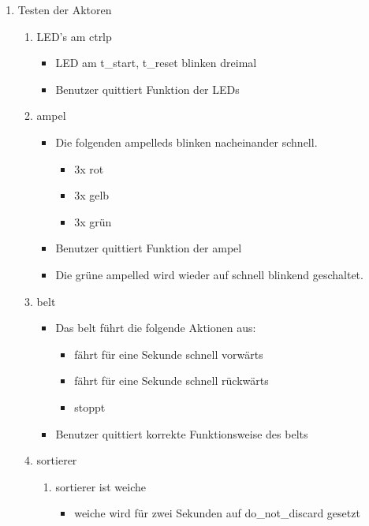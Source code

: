 \begin{enumerate}
    \item Testen der Aktoren
    \begin{enumerate}
        \item LED's am \gls{ctrlp}
        \begin{itemize}
            \item LED am \gls{t_start}, \gls{t_reset} blinken dreimal
            \item Benutzer quittiert Funktion der LEDs
        \end{itemize}
        \item \Gls{ampel}
        \begin{itemize}
            \item Die folgenden \glspl{ampelled} blinken nacheinander schnell.
            \begin{itemize}
                \item 3x rot
                \item 3x gelb
                \item 3x grün
            \end{itemize}
            \item Benutzer quittiert Funktion der \gls{ampel}
            \item Die grüne \Gls{ampelled} wird wieder auf schnell blinkend geschaltet.
        \end{itemize}
        \item \Gls{belt}
        \begin{itemize}
            \item Das \Gls{belt} führt die folgende Aktionen aus:
            \begin{itemize}
                \item fährt für eine Sekunde schnell vorwärts
                \item fährt für eine Sekunde schnell rückwärts
                \item stoppt
            \end{itemize}
            \item Benutzer quittiert korrekte Funktionsweise des \gls{belt}s
        \end{itemize}
        \item \Gls{sortierer}
        \begin{enumerate}
            \item \Gls{sortierer} ist \gls{weiche}
            \begin{itemize}
                \item \gls{weiche} wird für zwei Sekunden auf \gls{do_not_discard} gesetzt

\end{itemize}
\end{enumerate}
\end{enumerate}
\end{enumerate}
